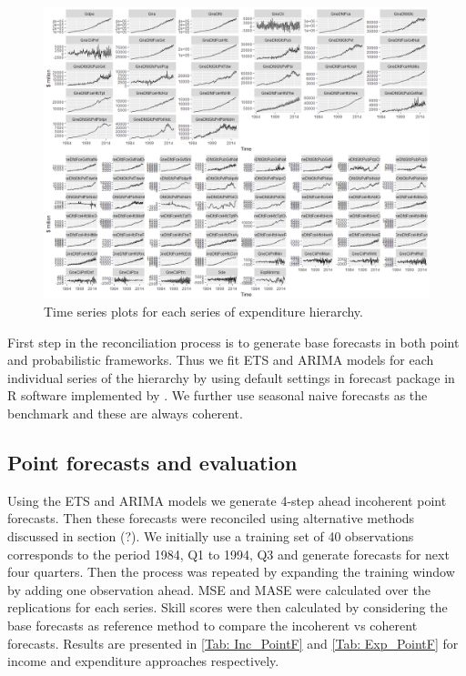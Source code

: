\documentclass[graybox]{svmult}
\begin{document}
\begin{figure}[H]
	\centering
	\small
	\includegraphics[scale=0.50]{Figs/TS-Exp.PNG}
	\caption{Time series plots for each series of expenditure hierarchy.}\label{TS-Exp}
\end{figure}

First step in the reconciliation process is to generate base forecasts in both point and probabilistic frameworks. Thus we fit ETS and ARIMA models for each individual series of the hierarchy by using default settings in forecast package in R software implemented by \citep{Hyndman2018}. We further use seasonal naive forecasts as the benchmark and these are always coherent.

\subsection{Point forecasts and evaluation}

Using the ETS and ARIMA models we generate 4-step ahead incoherent point forecasts. Then these forecasts were reconciled using alternative methods discussed in section (?). We initially use a training set of 40 observations corresponds to the period 1984, Q1 to 1994, Q3 and generate forecasts for next four quarters. Then the process was repeated by expanding the training window by adding one observation ahead. MSE and MASE were calculated over the replications for each series. Skill scores were then calculated by considering the base forecasts as reference method to compare the incoherent vs coherent forecasts. Results are presented in \ref{Tab: Inc_PointF} and \ref{Tab: Exp_PointF} for income and expenditure approaches respectively. \\
\end{document}
